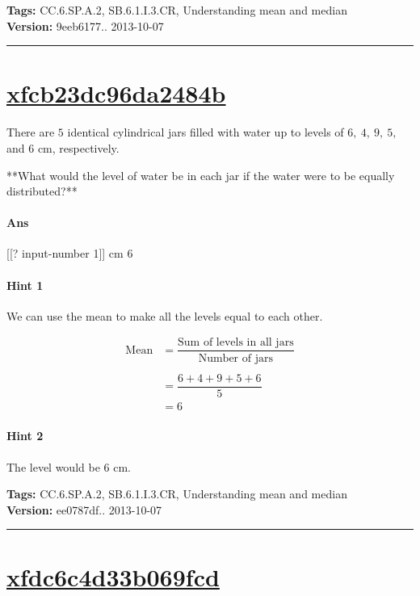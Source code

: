 \documentclass[twocolumn,10pt]{article}
\begin{document}
\medskip
\noindent
\textbf{Tags:} {\footnotesize CC.6.SP.A.2, SB.6.1.I.3.CR, Understanding mean and median}\\
\textbf{Version:} 9eeb6177.. 2013-10-07
\smallskip\hrule





\section{\href{https://www.khanacademy.org/devadmin/content/items/xfcb23dc96da2484b}{xfcb23dc96da2484b}}

\noindent
There are $5$ identical cylindrical jars filled with water up to levels of $6, ~4, ~9, ~5,$ and $6$ cm, respectively.  

**What would the level of water be in each jar if the water were to be equally distributed?**

\paragraph{Ans} [[? input-number 1]] cm  6

\paragraph{Hint 1}We can use the mean to make all the levels equal to each other. 

\begin{align*}\text{Mean} &= \dfrac{\text{Sum of levels in all jars}}{\text{Number of jars}}\\
\\
&= \dfrac{ 6+4+9+5+6 }{5}\\
&=6\end{align*}

\paragraph{Hint 2}The level would be $6$ cm.



\medskip
\noindent
\textbf{Tags:} {\footnotesize CC.6.SP.A.2, SB.6.1.I.3.CR, Understanding mean and median}\\
\textbf{Version:} ee0787df.. 2013-10-07
\smallskip\hrule





\section{\href{https://www.khanacademy.org/devadmin/content/items/xfdc6c4d33b069fcd}{xfdc6c4d33b069fcd}}
\end{document}
